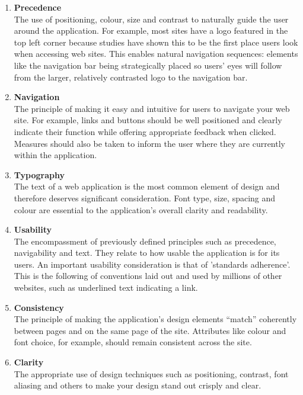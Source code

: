 \documentclass{l3proj}
\begin{document}
\begin{enumerate} 
\item{\textbf{Precedence}} \\
The use of positioning, colour, size and contrast to naturally guide the user around the application. For example, most sites have a logo featured in the top left corner because studies have shown this to be the first place users look when accessing web sites. This enables natural navigation sequences: elements like the navigation bar being strategically placed so users' eyes will follow from the larger, relatively contrasted logo to the navigation bar.

\item{\textbf{Navigation}} \\
The principle of making it easy and intuitive for users to navigate your web site. For example, links and buttons should be well positioned and clearly indicate their function while offering appropriate feedback when clicked. Measures should also be taken to inform the user where they are currently within the application.

\item{\textbf{Typography}} \\
The text of a web application is the most common element of design and therefore deserves significant consideration. Font type, size, spacing and colour are essential to the application's overall clarity and readability.

\item{\textbf{Usability}} \\
The encompassment of previously defined principles such as precedence, navigability and text. They relate to how usable the application is for its users. An important usability consideration is that of 'standards adherence'. This is the following of conventions laid out and used by millions of other websites, such as underlined text indicating a link.

\item{\textbf{Consistency}} \\
The principle of making the application's design elements ``match'' coherently between pages and on the same page of the site. Attributes like colour and font choice, for example, should remain consistent across the site.

\item{\textbf{Clarity}} \\
The appropriate use of design techniques such as positioning, contrast, font aliasing and others to make your design stand out crisply and clear. 
\end{enumerate}
	
\end{document}
